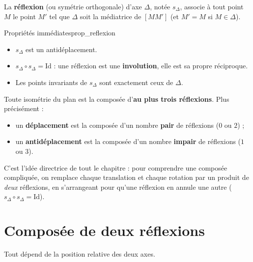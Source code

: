 \begin{definition}
	La \textbf{réflexion} (ou symétrie orthogonale) d'axe $\Delta$, notée
	$s_\Delta$, associe à tout point $M$ le point $M'$ tel que $\Delta$ soit la
	médiatrice de $[MM']$ (et $M'=M$ si $M\in\Delta$).
\end{definition}

\begin{propriete}{Propriétés immédiates}{prop_reflexion}
	\begin{itemize}[label=\textbullet]
		\item $s_\Delta$ est un antidéplacement.
		\item $s_\Delta\circ s_\Delta = \mathrm{Id}$ : une réflexion est une
		\textbf{involution}, elle est sa propre réciproque.
		\item Les points invariants de $s_\Delta$ sont exactement ceux de $\Delta$.
	\end{itemize}
\end{propriete}

\begin{theoreme}
	Toute isométrie du plan est la composée d'\textbf{au plus trois réflexions}.
	Plus précisément :
	\begin{itemize}[label=\textbullet]
		\item un \textbf{déplacement} est la composée d'un nombre \textbf{pair}
		de réflexions ($0$ ou $2$) ;
		\item un \textbf{antidéplacement} est la composée d'un nombre
		\textbf{impair} de réflexions ($1$ ou $3$).
	\end{itemize}
\end{theoreme}

\begin{astucebac}
	C'est l'idée directrice de tout le chapitre : pour comprendre une composée
	compliquée, on remplace chaque translation et chaque rotation par un
	produit de \emph{deux} réflexions, en s'arrangeant pour qu'une réflexion en
	annule une autre ($s_\Delta\circ s_\Delta=\mathrm{Id}$).
\end{astucebac}


\section{Composée de deux réflexions}

Tout dépend de la position relative des deux axes.

